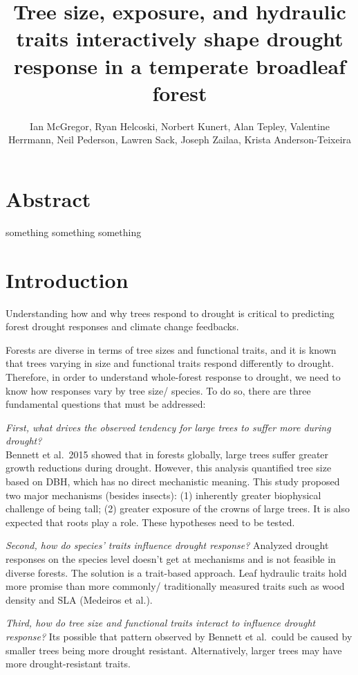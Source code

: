 \documentclass[]{book}
\title{Tree size, exposure, and hydraulic traits interactively shape drought response in a temperate broadleaf forest}
\author{Ian McGregor, Ryan Helcoski, Norbert Kunert, Alan Tepley, Valentine Herrmann, Neil Pederson, Lawren Sack, Joseph Zailaa, Krista Anderson-Teixeira}
\date{}
\begin{document}
\maketitle

{
\setcounter{tocdepth}{1}
\tableofcontents
}
\hypertarget{abstract}{%
\chapter{Abstract}\label{abstract}}

something something something

\hypertarget{introduction}{%
\chapter{Introduction}\label{introduction}}

Understanding how and why trees respond to drought is critical to predicting forest drought responses and climate change feedbacks.

Forests are diverse in terms of tree sizes and functional traits, and it is known that trees varying in size and functional traits respond differently to drought. Therefore, in order to understand whole-forest response to drought, we need to know how responses vary by tree size/ species. To do so, there are three fundamental questions that must be addressed:

\emph{First, what drives the observed tendency for large trees to suffer more during drought?}\\
Bennett et al.~2015 showed that in forests globally, large trees suffer greater growth reductions during drought. However, this analysis quantified tree size based on DBH, which has no direct mechanistic meaning. This study proposed two major mechanisms (besides insects): (1) inherently greater biophysical challenge of being tall; (2) greater exposure of the crowns of large trees. It is also expected that roots play a role. These hypotheses need to be tested.

\emph{Second, how do species' traits influence drought response?}
Analyzed drought responses on the species level doesn't get at mechanisms and is not feasible in diverse forests. The solution is a trait-based approach. Leaf hydraulic traits hold more promise than more commonly/ traditionally measured traits such as wood density and SLA (Medeiros et al.).

\emph{Third, how do tree size and functional traits interact to influence drought response?}
Its possible that pattern observed by Bennett et al.~could be caused by smaller trees being more drought resistant. Alternatively, larger trees may have more drought-resistant traits.
\end{document}
